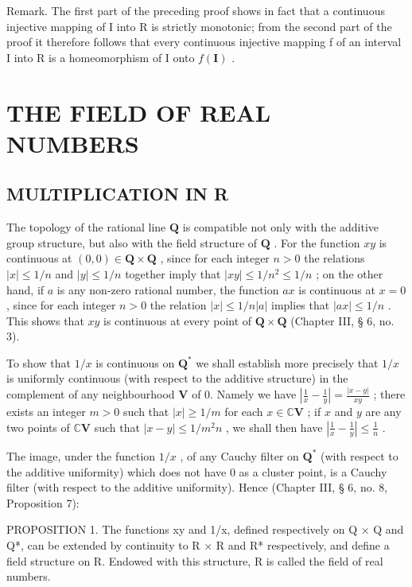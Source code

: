 Remark. The first part of the preceding proof shows in fact that a continuous injective mapping of I into R is strictly monotonic; from the second part of the proof it therefore follows that every continuous injective mapping f of an interval I into R is a homeomorphism of I onto \(f(\mathbf{I})\) .

\section{THE FIELD OF REAL NUMBERS}

\subsection{MULTIPLICATION IN R}

The topology of the rational line \(\mathbf{Q}\) is compatible not only with the additive group structure, but also with the field structure of \(\mathbf{Q}\) . For the function \(xy\) is continuous at \((0, 0) \in \mathbf{Q} \times \mathbf{Q}\) , since for each integer \(n > 0\) the relations \(|x| \leqslant 1/n\) and \(|y| \leqslant 1/n\) together imply that \(|xy| \leqslant 1/n^2 \leqslant 1/n\) ; on the other hand, if \(a\) is any non-zero rational number, the function \(ax\) is continuous at \(x = 0\) , since for each integer \(n > 0\) the relation \(|x| \leqslant 1/n |a|\) implies that \(|ax| \leqslant 1/n\) . This shows that \(xy\) is continuous at every point of \(\mathbf{Q} \times \mathbf{Q}\) (Chapter III, § 6, no. 3).

To show that \(1 / x\) is continuous on \(\mathbf{Q}^*\) we shall establish more precisely that \(1 / x\) is uniformly continuous (with respect to the additive structure) in the complement of any neighbourhood \(\mathbf{V}\) of 0. Namely we have \(\left|\frac{1}{x} - \frac{1}{y}\right| = \frac{|x - y|}{xy}\) ; there exists an integer \(m > 0\) such that \(|x| \geqslant 1 / m\) for each \(x \in \mathbb{C}\mathbf{V}\) ; if \(x\) and \(y\) are any two points of \(\mathbb{C}\mathbf{V}\) such that \(|x - y| \leqslant 1 / m^2 n\) , we shall then have \(\left|\frac{1}{x} - \frac{1}{y}\right| \leqslant \frac{1}{n}\) .

The image, under the function \(1 / x\) , of any Cauchy filter on \(\mathbf{Q}^*\) (with respect to the additive uniformity) which does not have \(0\) as a cluster point, is a Cauchy filter (with respect to the additive uniformity). Hence (Chapter III, § 6, no. 8, Proposition 7):

PROPOSITION 1. The functions xy and 1/x, defined respectively on Q × Q and Q*, can be extended by continuity to R × R and R* respectively, and define a field structure on R. Endowed with this structure, R is called the field of real numbers.

